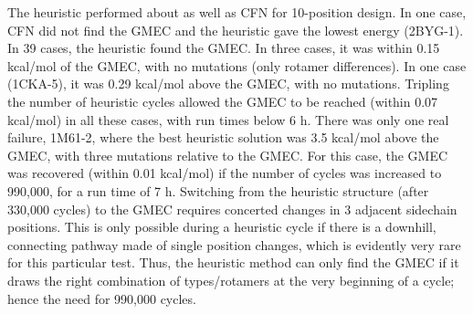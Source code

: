 The heuristic performed about as well as CFN for 10-position design. In one case, CFN did not find the GMEC and the heuristic gave the lowest energy (2BYG-1). In 39 cases, the heuristic found the GMEC. In three cases, it was within 0.15 kcal/mol of the GMEC, with no mutations (only rotamer differences). In one case (1CKA-5), it was 0.29 kcal/mol above the GMEC, with no mutations. Tripling the number of heuristic cycles allowed the GMEC to be reached (within 0.07 kcal/mol) in all these cases, with run times below 6 h. There was only one real failure, 1M61-2, where the best heuristic solution was 3.5 kcal/mol above the GMEC, with three mutations relative to the GMEC. For this case, the GMEC was recovered (within 0.01 kcal/mol) if the number of cycles was increased to 990,000, for a run time of 7 h. Switching from the heuristic structure (after 330,000 cycles) to the GMEC requires concerted changes in 3 adjacent sidechain positions. This is only possible during a heuristic cycle if there is a downhill, connecting pathway made of single position changes, which is evidently very rare for this particular test. Thus, the heuristic method can only find the GMEC if it draws the right combination of types/rotamers at the very beginning of a cycle; hence the need for 990,000 cycles.

